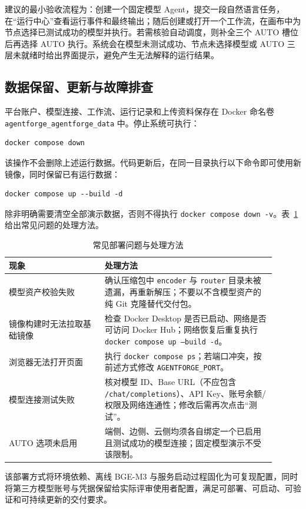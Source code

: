 建议的最小验收流程为：创建一个固定模型 Agent，提交一段自然语言任务，在``运行中心''查看运行事件和最终输出；随后创建或打开一个工作流，在画布中为节点选择已测试成功的模型并执行。若需核验自动调度，则补全三个 AUTO 槽位后再选择 AUTO 执行。系统会在模型未测试成功、节点未选择模型或 AUTO 三层未就绪时给出界面提示，避免产生无法解释的运行结果。

\subsection{数据保留、更新与故障排查}

平台账户、模型连接、工作流、运行记录和上传资料保存在 Docker 命名卷 \texttt{agentforge\_agentforge\_data} 中。停止系统可执行：

\begin{verbatim}
docker compose down
\end{verbatim}

该操作不会删除上述运行数据。代码更新后，在同一目录执行以下命令即可使用新镜像，同时保留已有运行数据：

\begin{verbatim}
docker compose up --build -d
\end{verbatim}

除非明确需要清空全部演示数据，否则不得执行 \texttt{docker compose down -v}。表~\ref{tab:judge-troubleshooting}给出常见问题的处理方法。

\begin{table}[htbp]
\centering
\caption{常见部署问题与处理方法}
\label{tab:judge-troubleshooting}
\begin{tabular}{p{0.32\linewidth}p{0.58\linewidth}}
\toprule
现象 & 处理方法 \\
\midrule
模型资产校验失败 & 确认压缩包中 \texttt{encoder} 与 \texttt{router} 目录未被遗漏，再重新解压；不要以不含模型资产的纯 Git 克隆替代交付包。 \\
镜像构建时无法拉取基础镜像 & 检查 Docker Desktop 是否已启动、网络是否可访问 Docker Hub；网络恢复后重复执行 \texttt{docker compose up --build -d}。 \\
浏览器无法打开页面 & 执行 \texttt{docker compose ps}；若端口冲突，按前述方式修改 \texttt{AGENTFORGE\_PORT}。 \\
模型连接测试失败 & 核对模型 ID、Base URL（不应包含 \texttt{/chat/completions}）、API Key、账号余额/权限及网络连通性；修改后需再次点击``测试''。 \\
AUTO 选项未启用 & 端侧、边侧、云侧均须各自绑定一个已启用且测试成功的模型连接；固定模型演示不受该限制。 \\
\bottomrule
\end{tabular}
\end{table}

该部署方式将环境依赖、离线 BGE-M3 与服务启动过程固化为可复现配置，同时将第三方模型账号与凭据保留给实际评审使用者配置，满足可部署、可启动、可验证和可持续更新的交付要求。
